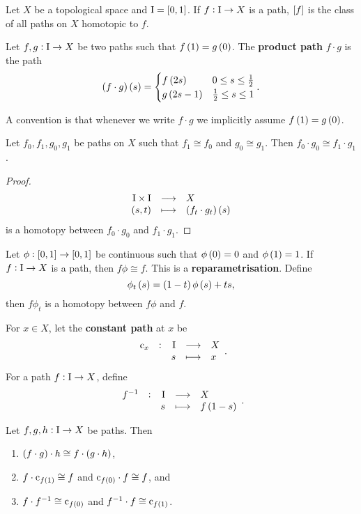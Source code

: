 Let $ X $ be a topological space and $ \I = \sbr{0, 1} $. If $ f : \mathrm{I} \to X $ is a path, $ \sbr{f} $ is the class of all paths on $ X $ homotopic to $ f $.

\begin{definition*}
Let $ f, g : \mathrm{I} \to X $ be two paths such that $ f\br{1} = g\br{0} $. The \textbf{product path} $ f \cdot g $ is the path
$$ \br{f \cdot g}\br{s} =
\begin{cases}
f\br{2s} & 0 \le s \le \tfrac{1}{2} \\
g\br{2s - 1} & \tfrac{1}{2} \le s \le 1
\end{cases}.
$$
\end{definition*}

A convention is that whenever we write $ f \cdot g $ we implicitly assume $ f\br{1} = g\br{0} $.

\begin{lemma}
\label{lem:1.2}
Let $ f_0, f_1, g_0, g_1 $ be paths on $ X $ such that $ f_1 \cong f_0 $ and $ g_0 \cong g_1 $. Then $ f_0 \cdot g_0 \cong f_1 \cdot g_1 $.
\end{lemma}

\begin{proof}
$$ \function{\I \times \I}{X}{\br{s, t}}{\br{f_t \cdot g_t}\br{s}} $$
is a homotopy between $ f_0 \cdot g_0 $ and $ f_1 \cdot g_1 $.
\end{proof}

\pagebreak

\begin{remark*}
Let $ \phi : \sbr{0, 1} \to \sbr{0, 1} $ be continuous such that $ \phi\br{0} = 0 $ and $ \phi\br{1} = 1 $. If $ f : \mathrm{I} \to X $ is a path, then $ f\phi \cong f $. This is a \textbf{reparametrisation}. Define
$$ \phi_t\br{s} = \br{1 - t}\phi\br{s} + ts, $$
then $ f\phi_t $ is a homotopy between $ f\phi $ and $ f $.
\end{remark*}

For $ x \in X $, let the \textbf{constant path} at $ x $ be
$$ \function[\c_x]{\I}{X}{s}{x}. $$
For a path $ f : \mathrm{I} \to X $, define
$$ \function[f^{-1}]{\I}{X}{s}{f\br{1 - s}}. $$

\begin{lemma}
\label{lem:1.3}
Let $ f, g, h : \mathrm{I} \to X $ be paths. Then
\begin{enumerate}
\item $ \br{f \cdot g} \cdot h \cong f \cdot \br{g \cdot h} $,
\item $ f \cdot \c_{f\br{1}} \cong f $ and $ \c_{f\br{0}} \cdot f \cong f $, and
\item $ f \cdot f^{-1} \cong \c_{f\br{0}} $ and $ f^{-1} \cdot f \cong \c_{f\br{1}} $.
\end{enumerate}
\end{lemma}

